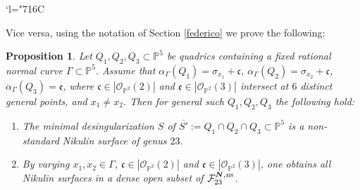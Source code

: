 \documentclass[JEP,XML,SOM,Unicode,NoEqCountersInSection,published]{cedram}
\newcommand{\Changelback}{\mathcode`l="716C}
\newcommand{\ns}{{\mkern1mu\mathrm{ns}}}
\newcommand{\bN}{\boldsymbol{N}}
\theoremstyle{plain}
\newtheorem{prop}[thm]{Proposition}
\theoremstyle{definition}
\newcommand\PP{{\mathbb P}}
\newcommand\F{{\mathcal F}}
\begin{document}
\Changelback

Vice versa, using the notation of Section \ref{federico} we prove the following:

\begin{prop}\label{ita}
Let $Q_1,Q_2,Q_3\subset \PP^5$ be quadrics containing a fixed rational normal curve $\Gamma\subset\PP^5$. Assume that $\alpha_\Gamma(Q_1)=\sigma_{x_1}+\mathfrak{c}$, $\alpha_\Gamma(Q_2)=\sigma_{x_2}+\mathfrak{c}$, $\alpha_\Gamma(Q_3)=\mathfrak{e}$, where $\mathfrak{c}\in |\mathcal O_{\PP^2}(2)|$ and $\mathfrak{e}\in |\mathcal O_{\PP^2}(3)|$ intersect at $6$ distinct general points, and $x_1\neq x_2$. Then for general such $Q_1,Q_2,Q_3$ the following hold:
\begin{enumerate}
\item\label{itai} The minimal desingularization $S$ of $\overline{S'}:= Q_1\cap Q_2\cap Q_3\subset \PP^5$ is a non-standard Nikulin surface of genus $23$.
\item\label{itaii} By varying $x_1,x_2\in \Gamma$, $\mathfrak{c}\in |\mathcal O_{\PP^2}(2)|$ and $\mathfrak{e}\in |\mathcal O_{\PP^2}(3)|$, one obtains all Nikulin surfaces in a dense open subset of $\F_{23}^{\bN,\ns}$.
\end{enumerate}
\end{prop}
\end{document}
